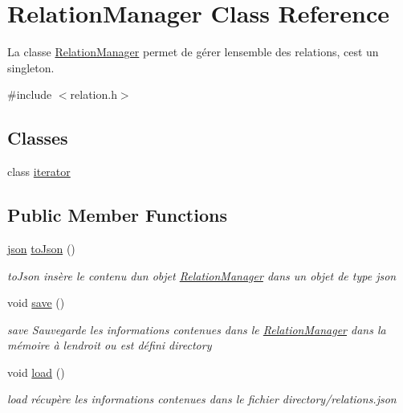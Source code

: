 \hypertarget{classRelationManager}{}\section{Relation\+Manager Class Reference}
\label{classRelationManager}


La classe \hyperlink{classRelationManager}{Relation\+Manager} permet de gérer l\textquotesingle{}ensemble des relations, c\textquotesingle{}est un singleton.  




{\ttfamily \#include $<$relation.\+h$>$}

\subsection*{Classes}
\begin{DoxyCompactItemize}
\item 
class \hyperlink{classRelationManager_1_1iterator}{iterator}
\end{DoxyCompactItemize}
\subsection*{Public Member Functions}
\begin{DoxyCompactItemize}
\item 
\hyperlink{classnlohmann_1_1basic__json}{json} \hyperlink{classRelationManager_a18ec52e110ddb59a526a8fdbbb1b8d7a}{to\+Json} ()
\begin{DoxyCompactList}\small\item\em to\+Json insère le contenu d\textquotesingle{}un objet \hyperlink{classRelationManager}{Relation\+Manager} dans un objet de type json \end{DoxyCompactList}\item 
\mbox{\label{classRelationManager_ac9b805487819264d8ef7faab68521822}} 
void \hyperlink{classRelationManager_ac9b805487819264d8ef7faab68521822}{save} ()
\begin{DoxyCompactList}\small\item\em save Sauvegarde les informations contenues dans le \hyperlink{classRelationManager}{Relation\+Manager} dans la mémoire à l\textquotesingle{}endroit ou est défini directory \end{DoxyCompactList}\item 
\mbox{\label{classRelationManager_a593a538680d22c21a8d1a8dd981f6b44}} 
void \hyperlink{classRelationManager_a593a538680d22c21a8d1a8dd981f6b44}{load} ()
\begin{DoxyCompactList}\small\item\em load récupère les informations contenues dans le fichier directory/relations.\+json \end{DoxyCompactList}\end{DoxyCompactItemize}
